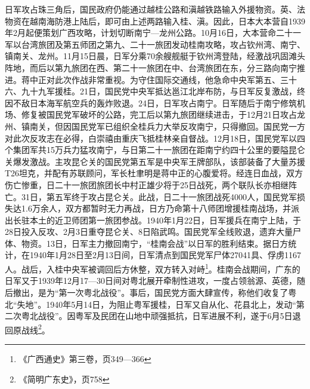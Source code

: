 日军攻占珠三角后，国民政府仍能通过越桂公路和滇越铁路输入外援物资。英、法物资在越南海防港上陆后，即可由上述两路输入桂、滇。因此，日本大本营自1939年2月起便策划广西攻略，计划切断南宁—龙州公路。10月16日，大本营命二十一军以台湾旅团及第五师团之第九、二十一旅团发动桂南攻略，攻占钦州湾、南宁、镇南关、龙州。11月15日晨，日军分乘70余艘舰艇于钦州湾登陆，经激战巩固滩头阵地，而后以第九旅团在西、第二十一旅团在中、台湾旅团在东，分三路向南宁推进。蒋中正对此次作战非常重视。为守住国际交通线，他急命中央军第五、三十六、九十九军援桂。21日，国民党中央军抵达邕江北岸布防，与日军反复激战，终因不敌日本海军航空兵的轰炸败退。24日，日军攻占南宁。日军随后于南宁修筑机场、修复被国民党军破坏的公路，完工后以第九旅团继续进击，于12月21日攻占龙州、镇南关，但因国民党军已组织全桂兵力大举反攻南宁，只得撤回。国民党一方对此次反攻志在必得，白崇禧由重庆飞抵桂林亲自督战。12月18日，国民党军以四个集团军共15万兵力猛攻南宁，与日第二十一旅团在距南宁约四十公里的要隘昆仑关爆发激战。主攻昆仑关的国民党第五军是中央军王牌部队，该部装备了大量苏援T26坦克，并配有苏联顾问，军长杜聿明是蒋中正的心腹爱将。经连日血战，双方伤亡惨重，日二十一旅团旅团长中村正雄少将于25日战死，两个联队长亦相继阵亡。31日，第五军终于攻占昆仑关。此战，日二十一旅团战死4000人，国民党军损失达1.6万余人，双方都暂时无力再战，日方乃命第十八师团增援桂南战场，并派出长驻本土的近卫师团第一旅团参战。1940年1月22日，日军援兵在南宁上陆，于28日投入反攻、2月3日重夺昆仑关、8日陷武鸣。国民党军全线败退，遗弃大量尸体、物资。13日，日军主力撤回南宁，“桂南会战”以日军的胜利结束。据日方统计，在1940年1月28日至2月13日间，日军清点到国民党军尸体27041具、俘虏1167人。战后，入桂中央军被调回后方休整，双方转入对峙\footnote{《广西通史》第三卷，页349—366}。桂南会战期间，广东的日军又于1939年12月17—30日间对粤北展开牵制性进攻，一度占领翁源、英德，随后撤出，是为“第一次粤北战役”。事后，国民党方面大肆宣传，称他们收复了粤北“失地”。1940年5月14日，为阻止粤军援桂，日军又自从化、花县北上，发动“第二次粤北战役”。因粤军及民团在山地中顽强抵抗，日军进展不利，遂于6月5日退回原战线\footnote{《简明广东史》，页758}。 

